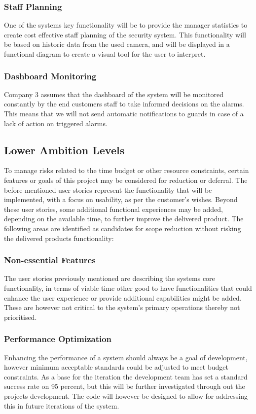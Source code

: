 \documentclass{article}
\begin{document}
\subsubsection{Staff Planning}
One of the systems key functionality will be to provide the manager statistics to create cost effective staff planning of the security system. This functionality will be based on historic data from the used camera, and will be displayed in a functional diagram to create a visual tool for the user to interpret.

\subsubsection{Dashboard Monitoring}
Company 3 assumes that the dashboard of the system will be monitored constantly by the end customers staff to take informed decisions on the alarms. This means that we will not send automatic notifications to guards in case of a lack of action on triggered alarms.

\subsection{Lower Ambition Levels}
To manage risks related to the time budget or other resource constraints, certain features or goals of this project may be considered for reduction or deferral. The before mentioned user stories represent the functionality that will be implemented, with a focus on usability, as per the customer's wishes. Beyond these user stories, some additional functional experiences may be added, depending on the available time, to further improve the delivered product. The following areas are identified as candidates for scope reduction without risking the delivered products functionality:

\subsubsection{Non-essential Features}
The user stories previously mentioned are describing the systems core functionality, in terms of viable time other good to have functionalities that could enhance the user experience or provide additional capabilities might be added. These are however not critical to the system's primary operations thereby not prioritised.

\subsubsection{Performance Optimization}
Enhancing the performance of a system should always be a goal of development, however minimum acceptable standards could be adjusted to meet budget constraints. As a base for the iteration the development team has set a standard success rate on 95 percent, but this will be further investigated through out the projects development. The code will however be designed to allow for addressing this in future iterations of the system. 
\end{document}
